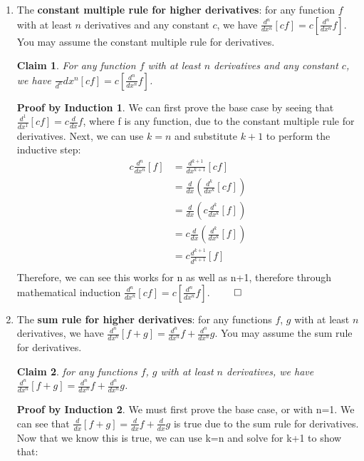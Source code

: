 \documentclass[11pt]{letter}
\newtheorem{claim}{Claim}
\theoremstyle{definition}
\newtheorem{PBI}{Proof by Induction}
\begin{document}
\begin{description}
\begin{enumerate}
			\item The {\bfseries constant multiple rule for higher derivatives}: for any function $f$ with at least $n$ derivatives and any constant $c$, we have $\frac{d^n}{dx^n}\left[cf\right]=c\left[\frac{d^n}{dx^n}f\right]$. You may assume the constant multiple rule for derivatives.
\begin{claim}
For any function $f$ with at least $n$ derivatives and any constant $c$, we have $\frac\
{d^n}{dx^n}\left[cf\right]=c\left[\frac{d^n}{dx^n}f\right]$.
\end{claim}
\begin{PBI}
We can first prove the base case by seeing that $\frac{d^1}{dx^1}[cf]=c\frac{d}{dx}f$, where f is any function, due to the constant multiple rule for derivatives. Next, we can use $k=n$ and substitute $k+1$  to perform the inductive step: \\
\begin{align*}
c \frac{d^{n}}{dx^{n}}[f]&=\frac{d^{k+1}}{dx^{k+1}}[cf] \\
&=\frac{d}{dx}(\frac{d^{k}}{dx^{k}}[cf]) \\
&=\frac{d}{dx}(c\frac{d^k}{dx^k}[f]) \tag{Substituted using equation given in claim} \\
&=c\frac{d}{dx}(\frac{d^k}{dx^k}[f]) \tag{Used constant multiple rule for derivatives} \\
&=c\frac{d^{k+1}}{d^{k+1}}[f] \\
\end{align*}
Therefore, we can see this works for n as well as n+1, therefore through mathematical induction $\frac{d^n}{dx^n}\left[cf\right]=c\left[\frac{d^n}{dx^n}f\right]$. $\qed$
\end{PBI}
			\item The {\bfseries sum rule for higher derivatives}: for any functions $f$, $g$ with at least $n$ derivatives, we have $\frac{d^n}{dx^n}\left[f+g\right]=\frac{d^n}{dx^n}f+\frac{d^n}{dx^n}g$. You may assume the sum rule for derivatives.
                          \begin{claim}
                            for any functions $f$, $g$ with at least $n$ derivatives, we have $\frac{d^n}{dx^n}\left[f+g\right]=\frac{d^n}{dx^n}f+\frac{d^n}{dx^n}g$.
                            \end{claim}
                          \begin{PBI}
                            We must first prove the base case, or with n=1. We can see that  $\frac{d}{dx}\left[f+g\right]=\frac{d}{dx}f+\frac{d}{dx}g$ is true due to the sum rule for derivatives. Now that we know this is true, we can use k=n and solve for k+1 to show that: \\

\end{PBI}
\end{enumerate}
\end{description}
\end{document}
